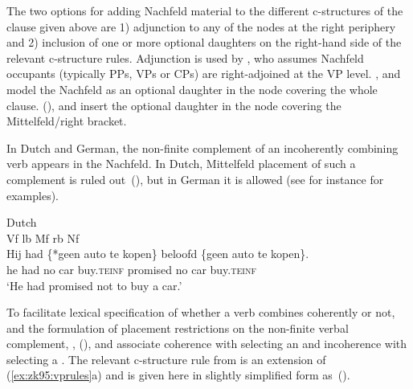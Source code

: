 \documentclass[output=paper,hidelinks]{langscibook}
\begin{document}
The two options for adding Nachfeld material to the different
c-structures of the clause given above are 1) adjunction to any of the
nodes at the right periphery and 2) inclusion of one or more optional
daughters on the right-hand side of the relevant c-structure
rules. Adjunction is used by \citet{Berman2003}, who assumes Nachfeld
occupants (typically PPs, VPs or CPs) are right-adjoined at the VP
level. \citet{rohrer:1996}, \citet{clement-etal:2002:lfg} and
 model the Nachfeld as an optional daughter in
the node covering the whole clause. \citeauthor{zaenen-kaplan1995}
(\citeyear{zaenen-kaplan1995,ZaenenKaplan2002:Subsumption}), and
\citet{KaplanZaenen2003} insert the optional daughter in the node
covering the Mittelfeld/right bracket.

In Dutch and German, the non-finite complement of an incoherently
combining verb appears in the Nachfeld. In Dutch, Mittelfeld placement of such a complement is ruled out~(), but in German it is allowed (see for
  instance \citealt{rohrer:1996} for examples).
%
\begin{exe}
  \ex Dutch\\
      {\glll
        Vf\streep{.25em} lb\streep{.5em} \phantom{\{*}Mf\streep{6.5em} {} {} rb\streep{2em} \phantom{\{}Nf\streep{6.75em}\\
        Hij\hspace*{1pt} had \{*geen auto {te kopen}\} beloofd \{geen auto {te kopen}\}.\\
        he had \phantom{\{*}no car buy.\textsc{teinf} promised \phantom{\{}no car buy.\textsc{teinf}\\
        \glt `He had promised not to buy a car.'}
\end{exe}
%
To facilitate lexical specification of whether a verb combines
coherently or not, and the formulation of placement restrictions on
the non-finite verbal complement, \citet{rohrer:1996},
\citeauthor{zaenen-kaplan1995}
(\citeyear{zaenen-kaplan1995,ZaenenKaplan2002:Subsumption}), and
\citet{KaplanZaenen2003} associate coherence with selecting an
\XCOMP{} and incoherence with selecting a \COMP{}. The relevant
c-structure rule from \citet{KaplanZaenen2003} is an extension of
(\ref{ex:zk95:vprules}a) and is given here in slightly simplified form
as~().
\end{document}
